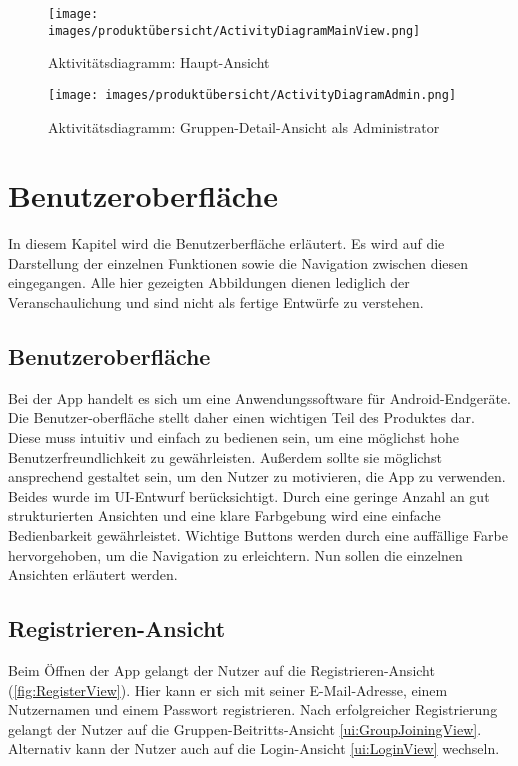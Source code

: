 \documentclass[parskip=full]{scrartcl}
\newcommand{\changelocaltocdepth}[1]{%
  \addtocontents{toc}{\protect\setcounter{tocdepth}{#1}}%
  \setcounter{tocdepth}{#1}%
}
\newcommand{\enablesubsectionnumbering}[1]{
    \renewcommand{\thesubsection}{$\langle$#1\arabic{subsection}0$\rangle$}
    \changelocaltocdepth{1} 
}
\begin{document}
\begin{figure}[!htp]
    \centering
    \texttt{[image: images/produktübersicht/ActivityDiagramMainView.png]}
    \caption{Aktivitätsdiagramm: Haupt-Ansicht}
    \label{fig:ActivityDiagramMainView}
\end{figure}
\newpage

\begin{figure}[!htp]
    \centering
    \begin{adjustbox}{right=150mm}
        \texttt{[image: images/produktübersicht/ActivityDiagramAdmin.png]}
    \end{adjustbox}

    \caption{Aktivitätsdiagramm: Gruppen-Detail-Ansicht als Administrator}
    \label{fig:ActivityDiagramAdmin}
\end{figure}
\newpage

\section{ Benutzeroberfläche }
\enablesubsectionnumbering{UI}
In diesem Kapitel wird die Benutzerberfläche erläutert. Es wird auf die Darstellung der einzelnen Funktionen sowie die Navigation zwischen diesen eingegangen. Alle hier gezeigten Abbildungen dienen lediglich der Veranschaulichung und sind nicht als fertige Entwürfe zu verstehen.

\subsection*{Benutzeroberfläche}
Bei der App handelt es sich um eine Anwendungssoftware für Android-Endgeräte. Die Benutzer-oberfläche stellt daher einen wichtigen Teil des Produktes dar. Diese muss intuitiv und einfach zu bedienen sein, um eine möglichst hohe Benutzerfreundlichkeit zu gewährleisten. Außerdem sollte sie möglichst ansprechend gestaltet sein, um den Nutzer zu motivieren, die App zu verwenden. Beides wurde im UI-Entwurf berücksichtigt. Durch eine geringe Anzahl an gut strukturierten Ansichten und eine klare Farbgebung wird eine einfache Bedienbarkeit gewährleistet. Wichtige Buttons werden durch eine auffällige Farbe hervorgehoben, um die Navigation zu erleichtern. Nun sollen die einzelnen Ansichten erläutert werden.

\subsection{Registrieren-Ansicht}
\label{ui:RegisterView}
Beim Öffnen der App gelangt der Nutzer auf die Registrieren-Ansicht (\autoref{fig:RegisterView}). Hier kann er sich mit seiner E-Mail-Adresse, einem Nutzernamen und einem Passwort registrieren. Nach erfolgreicher Registrierung gelangt der Nutzer auf die Gruppen-Beitritts-Ansicht \ref{ui:GroupJoiningView}. Alternativ kann der Nutzer auch auf die Login-Ansicht \ref{ui:LoginView} wechseln.
\end{document}
